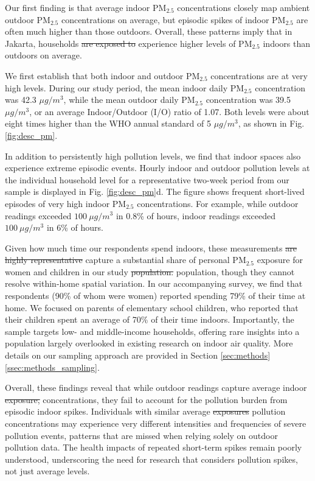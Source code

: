 \documentclass[9pt,twocolumn,twoside]{pnas-new}
\providecommand{\DIFadd}[1]{{\protect\color{red}#1}}
\providecommand{\DIFdel}[1]{{\protect\color{red}\protect\sout{#1}}}
\begin{document}
Our first finding is that average indoor PM$_{2.5}$ concentrations closely map ambient outdoor PM$_{2.5}$ concentrations on average, but episodic spikes of indoor PM$_{2.5}$ are often much higher than those outdoors. Overall, these patterns imply that in Jakarta, households \DIFdel{are exposed to} \DIFadd{experience} higher levels of PM$_{2.5}$ indoors than outdoors on average.

We first establish that both indoor and outdoor PM$_{2.5}$ concentrations are at very high levels. During our study period, the mean indoor daily PM$_{2.5}$ concentration was 42.3 $\mu g/m^3$, while the mean outdoor daily PM$_{2.5}$ concentration was 39.5 $\mu g/m^3$, or an average Indoor/Outdoor (I/O) ratio of 1.07. Both levels were about eight times higher than the WHO annual standard of 5 $\mu g/m^3$, as shown in Fig. \ref{fig:desc_pm}.

In addition to persistently high pollution levels, we find that indoor spaces also experience extreme episodic events. Hourly indoor and outdoor pollution levels at the individual household level for a representative two-week period from our sample is displayed in Fig. \ref{fig:desc_pm}d. 
The figure shows frequent short-lived episodes of very high indoor PM$_{2.5}$ concentrations. For example, while outdoor readings exceeded $100~\mu g/m^3$ in 0.8\% of hours, indoor readings exceeded $100~\mu g/m^3$ in 6\% of hours. 

Given how much time our respondents spend indoors, these measurements \DIFdel{are highly representative} \DIFadd{capture a substantial share} of personal PM$_{2.5}$ exposure for women and children in our study \DIFdel{population.} \DIFadd{population, though they cannot resolve within-home spatial variation.} In our accompanying survey, we find that respondents (90\% of whom were women) reported spending 79\% of their time at home. We focused on parents of elementary school children, who reported that their children spent an average of 70\% of their time indoors. Importantly, the sample targets low- and middle-income households, offering rare insights into a population largely overlooked in existing research on indoor air quality. More details on our sampling approach are provided in Section \ref{sec:methods}\ref{ssec:methods_sampling}.

Overall, these findings reveal that while outdoor readings capture average indoor \DIFdel{exposure,} \DIFadd{concentrations,} they fail to account for the pollution burden from episodic indoor spikes. Individuals with similar average \DIFdel{exposures} \DIFadd{pollution concentrations} may experience very different intensities and frequencies of severe pollution events, patterns that are missed when relying solely on outdoor pollution data. The health impacts of repeated short-term spikes remain poorly understood, underscoring the need for research that considers pollution spikes, not just average levels.
\end{document}
